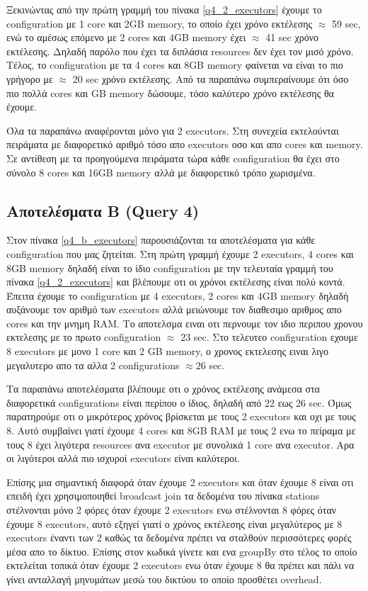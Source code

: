 \documentclass[12pt, a4paper]{article}
\begin{document}
Ξεκινώντας από την πρώτη γραμμή του πίνακα \ref{q4_2_executors} έχουμε το configuration με
1 core και 2GB memory, το οποίο έχει χρόνο εκτέλεσης $\approx$ 59 sec, ενώ το αμέσως επόμενο
με 2 cores και 4GB memory έχει $\approx$ 41 sec χρόνο εκτέλεσης. Δηλαδή παρόλο που έχει
τα διπλάσια resources δεν έχει τον μισό χρόνο. Τέλος, το configuration με τα 4 cores και
8GB memory φαίνεται να είναι το πιο γρήγορο με $\approx$ 20 sec χρόνο εκτέλεσης. Από τα
παραπάνω συμπεραίνουμε ότι όσο πιο πολλά cores και GB memory δώσουμε, τόσο καλύτερο
χρόνο εκτέλεσης θα έχουμε. 

Όλα τα παραπάνω αναφέρονται μόνο για 2 executors. Στη συνεχεία εκτελούνται πειράματα με
διαφορετικό αριθμό τόσο απο executors οσο και απο cores και memory. Σε αντίθεση με τα 
προηγούμενα πειράματα τώρα κάθε configuration θα έχει στο σύνολο 8 cores και 16GB memory 
αλλά με διαφορετικό τρόπο χωρισμένα. 


\subsection*{Αποτελέσματα Β (Query 4)}

Στον πίνακα \ref{q4_b_executors} παρουσιάζονται τα αποτελέσματα για κάθε configuration
που μας ζητείται. Στη πρώτη γραμμή έχουμε 2 executors, 4 cores και 8GB memory δηλαδή
είναι το ίδιο configuration με την τελευταία γραμμή του πίνακα \ref{q4_2_executors}
και βλέπουμε οτι οι χρόνοι εκτέλεσης είναι πολύ κοντά. Έπειτα έχουμε το configuration με
4 executors, 2 cores και 4GB memory δηλαδή αυξάνουμε τον αριθμό των executors αλλά μειώνουμε
τον διαθεσιμο αριθμος απο cores και την μνημη RAM. Το αποτελσμα ειναι οτι περνουμε
τον ιδιο περιπου χρονου εκτελεσης με το πρωτο configuration $\approx$ 23 sec. Στο τελευτεο
configuration εχουμε 8 executors με μονο 1 core και 2 GB memory, ο χρονος εκτελεσης 
ειναι λιγο μεγαλυτερο απο τα αλλα 2 configurations $\approx 26$ sec.

Τα παραπάνω αποτελέσματα βλέπουμε οτι ο χρόνος εκτέλεσης ανάμεσα στα διαφορετικά configurations
είναι περίπου ο ίδιος, δηλαδή από 22 εως 26 sec. Όμως παρατηρούμε οτι ο μικρότερος χρόνος
βρίσκεται με τους 2 executors και οχι με τους 8. Αυτό συμβαίνει γιατί έχουμε 4 cores και 8GB RAM
με τους 2 ενω το πείραμα με τους 8  έχει λιγότερα resources ανα executor με συνολικά 1 core
ανα executor. Αρα οι λιγότεροι αλλά πιο ισχυροί executors είναι καλύτεροι.

Επίσης μια σημαντική διαφορά όταν έχουμε 2 executors και όταν έχουμε 8 είναι οτι επειδή έχει
χρησιμοποιηθεί broadcast join τα δεδομένα του πίνακα stations στέλνονται μόνο 2 φόρες
όταν έχουμε 2 executors ενω στέλνονται 8 φόρες όταν έχουμε 8 executors, αυτό εξηγεί γιατί
ο χρόνος εκτέλεσης είναι μεγαλύτερος με 8 executors έναντι των 2 καθώς τα δεδομένα πρέπει να
σταλθούν περισσότερες φορές μέσα απο το δίκτυο. Επίσης στον κωδικά γίνετε και ενα
groupBy στο τέλος το οποίο εκτελείται τοπικά όταν έχουμε 2 executors ενω όταν έχουμε 8 θα 
πρέπει και πάλι να γίνει ανταλλαγή μηνυμάτων μεσώ του δικτύου το οποίο προσθέτει
overhead.
\end{document}
